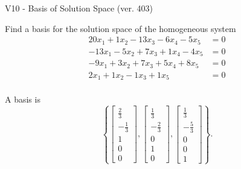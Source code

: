 \begin{exercise}
  \begin{exerciseTitle}V10 - Basis of Solution Space (ver. 403)\end{exerciseTitle}
  \begin{exerciseStatement}
    Find a basis for the solution space of the homogeneous system 
\begin{align*}
 20 x_ 1 + 1 x_ 2 -13 x_ 3 -6 x_ 4 -5 x_ 5 &= 0  \\ 
  -13 x_ 1 -5 x_ 2 + 7 x_ 3 + 1 x_ 4 -4 x_ 5 &= 0  \\ 
  -9 x_ 1 + 3 x_ 2 + 7 x_ 3 + 5 x_ 4 + 8 x_ 5 &= 0  \\ 
  2 x_ 1 + 1 x_ 2 -1 x_ 3 + 1 x_ 5 &= 0  \\ 
 \end{align*}


 
  \end{exerciseStatement}

  \begin{exerciseAnswer}
   A basis is   
\[\left\{\left[\begin{array}{c}
\frac{2}{3} \\
-\frac{1}{3} \\
1 \\
0 \\
0
\end{array}\right] , \left[\begin{array}{c}
\frac{1}{3} \\
-\frac{2}{3} \\
0 \\
1 \\
0
\end{array}\right] , \left[\begin{array}{c}
\frac{1}{3} \\
-\frac{5}{3} \\
0 \\
0 \\
1
\end{array}\right]\right\}.\]

  


  \end{exerciseAnswer}
\end{exercise}